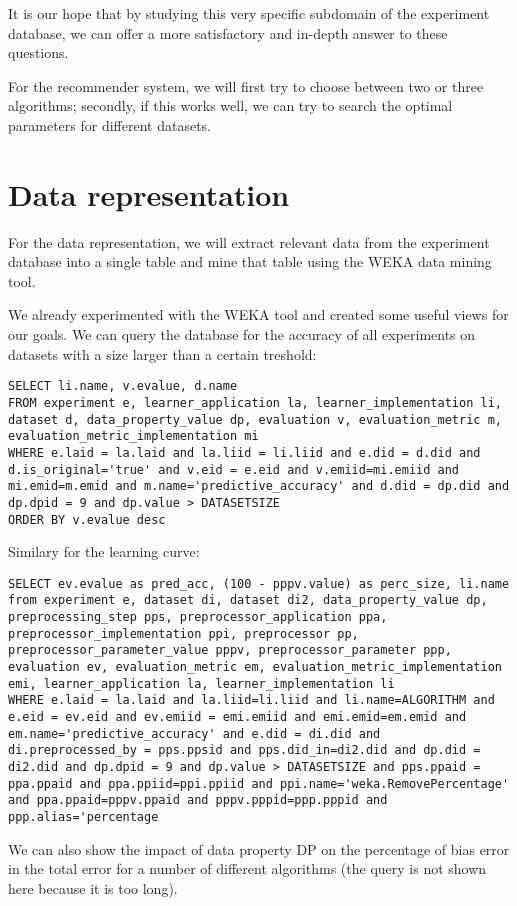 \documentclass[a4paper,10pt]{scrartcl}
\begin{document}
It is our hope that by studying this very specific subdomain of the experiment database,
we can offer a more satisfactory and in-depth answer to these questions.

For the recommender system, we will first try to choose between two or three algorithms;
secondly, if this works well, we can try to search the optimal parameters for different datasets.

\section{Data representation}
For the data representation, we will extract relevant data from the experiment database into
a single table\cite{42801} and mine that table using the WEKA data mining tool\cite{weka}.

We already experimented with the WEKA tool and created some useful views for our goals. %
We can query the database for the accuracy of all experiments on datasets with a size larger than a certain treshold:
\begin{lstlisting}
SELECT li.name, v.evalue, d.name
FROM experiment e, learner_application la, learner_implementation li, dataset d, data_property_value dp, evaluation v, evaluation_metric m, evaluation_metric_implementation mi
WHERE e.laid = la.laid and la.liid = li.liid and e.did = d.did and d.is_original='true' and v.eid = e.eid and v.emiid=mi.emiid and mi.emid=m.emid and m.name='predictive_accuracy' and d.did = dp.did and dp.dpid = 9 and dp.value > DATASETSIZE
ORDER BY v.evalue desc
\end{lstlisting}

Similary for the learning curve:
\begin{lstlisting}
SELECT ev.evalue as pred_acc, (100 - pppv.value) as perc_size, li.name from experiment e, dataset di, dataset di2, data_property_value dp, preprocessing_step pps, preprocessor_application ppa, preprocessor_implementation ppi, preprocessor pp, preprocessor_parameter_value pppv, preprocessor_parameter ppp, evaluation ev, evaluation_metric em, evaluation_metric_implementation emi, learner_application la, learner_implementation li
WHERE e.laid = la.laid and la.liid=li.liid and li.name=ALGORITHM and e.eid = ev.eid and ev.emiid = emi.emiid and emi.emid=em.emid and em.name='predictive_accuracy' and e.did = di.did and di.preprocessed_by = pps.ppsid and pps.did_in=di2.did and dp.did = di2.did and dp.dpid = 9 and dp.value > DATASETSIZE and pps.ppaid = ppa.ppaid and ppa.ppiid=ppi.ppiid and ppi.name='weka.RemovePercentage' and ppa.ppaid=pppv.ppaid and pppv.pppid=ppp.pppid and ppp.alias='percentage
\end{lstlisting}
We can also show the impact of data property DP on the percentage of bias error in the total error for a number of different algorithms (the query is not shown here because it is too long).
\end{document}

